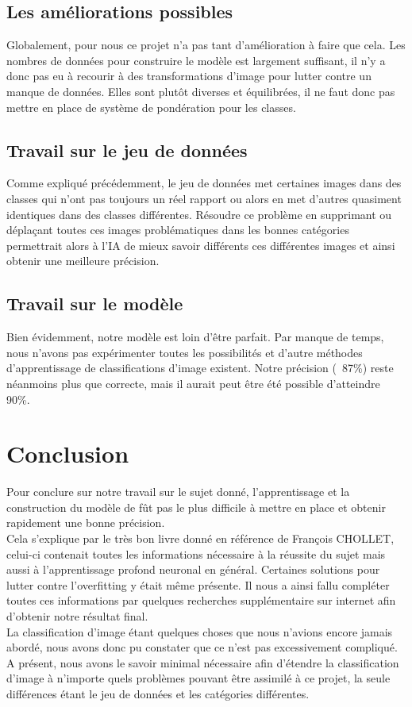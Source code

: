 \documentclass[12pt ,a4paper ]{article}
\begin{document}
\newpage
\begin{multicols}{2} 

\newpage
\section{Les améliorations possibles}
Globalement, pour nous ce projet n'a pas tant d'amélioration à faire que cela. Les nombres de données pour construire le modèle est largement suffisant, il n'y a donc pas eu à recourir à des transformations d'image pour lutter contre un manque de données. Elles sont plutôt diverses et équilibrées, il ne faut donc pas mettre en place de système de pondération pour les classes.\\

\subsection{Travail sur le jeu de données}
Comme expliqué précédemment, le jeu de données met certaines images dans des classes qui n'ont pas toujours un réel rapport ou alors en met d'autres quasiment identiques dans des classes différentes. Résoudre ce problème en supprimant ou déplaçant toutes ces images problématiques dans les bonnes catégories permettrait alors à l'IA de mieux savoir différents ces différentes images et ainsi obtenir une meilleure précision. 

\subsection{Travail sur le modèle}
Bien évidemment, notre modèle est loin d'être parfait. Par manque de temps, nous n'avons pas expérimenter toutes les possibilités et d'autre méthodes d'apprentissage de classifications d'image existent. Notre précision (~87\%)  reste néanmoins plus que correcte, mais il aurait peut être été possible d'atteindre 90\%. 

\end{multicols}
\newpage
\section{Conclusion}
Pour conclure sur notre travail sur le sujet donné, l'apprentissage et la construction du modèle de fût pas le plus difficile à mettre en place et obtenir rapidement une bonne précision. \\
Cela s'explique par le très bon livre donné en référence de François CHOLLET, celui-ci contenait toutes les informations nécessaire à la réussite du sujet mais aussi à l'apprentissage profond neuronal en général.  Certaines solutions pour lutter contre l'overfitting y était même présente. Il nous a ainsi fallu compléter toutes ces informations par quelques recherches supplémentaire sur internet afin d'obtenir notre résultat final.\\
La classification d'image étant quelques choses que nous n'avions encore jamais abordé, nous avons donc pu constater que ce n'est pas excessivement compliqué. A présent, nous avons le savoir minimal nécessaire afin d'étendre la classification d'image à n'importe quels problèmes pouvant être assimilé à ce projet, la seule différences étant le jeu de données et les catégories différentes. 
\end{document}
